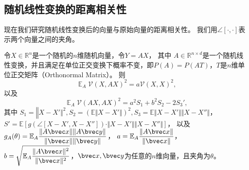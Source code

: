 \subsection{随机线性变换的距离相关性}
现在我们研究随机线性变换后的向量与原始向量的距离相关性。
我们用$\angle[\cdot, \cdot]$表示两个向量之间的夹角。
\begin{theorem}
\label{thm:ss-perm:linear-dcov}
    令$X\in \mathbb R^n$是一个随机的$n$维随机向量，令$Y = AX$，
    其中 $A \in \mathbb R^{n \times d}$是一个随机线性变换，并且满足在单位正交变换下概率不变，即$P(A) = P(AT)$，$T$是$n$维单位正交矩阵（Orthonormal Matrix）。
    则
    \begin{equation}
    \label{eq:ss-perm:linear-dcov1}
            \mathop{\mathbb E}_A \mathcal{V}(X, AX)^2 = a\mathcal{V}(X, X)^2,
    \end{equation}
    以及    
    \begin{equation}
    \label{eq:ss-perm:linear-dcov2}
        \mathop{\mathbb E}_A \mathcal{V}(AX, AX)^2 = {a^2S_1 + b^2S_2 - 2S_3'},
    \end{equation}
    其中 $S_1 = \mathbb \Vert X - X'\Vert^2, S_2 = \left( \mathbb E \Vert X - X'\Vert \right)^2, S_3 = \mathbb E \Vert X - X' \Vert \Vert X - X'' \Vert$，\\
    $S' = \mathbb E \left[ g(\angle [X - X', X - X'']) \cdot \Vert X - X'\Vert \Vert X - X'' \Vert \right]$，
    以及
    $g_A(\theta) = \mathbb E_A \dfrac{\Vert A\bvec x \Vert \Vert A\bvec y \Vert}{\Vert \bvec x \Vert \Vert \bvec y \Vert} $，
    $a = \mathbb E_A \dfrac{\Vert A\bvec x \Vert}{\Vert \bvec x \Vert}$，
    $b = \sqrt{\mathbb E_A \dfrac{\Vert A\bvec x \Vert^2}{\Vert \bvec x \Vert^2}}$，$\bvec x, \bvec y$为任意的$n$维向量，且夹角为$\theta$。
\end{theorem}

